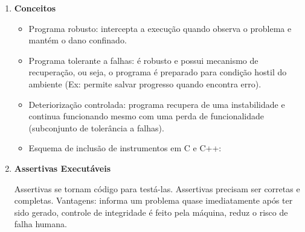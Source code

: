 \documentclass[
	12pt, %
]{fphw}
\begin{document}
\begin{doublespace}
\begin{enumerate}[label=\textbf{\arabic*})]
        \item \textbf{Conceitos}

              \begin{itemize}

                  \item Programa robusto: intercepta a execução quando observa o problema e mantém o dano confinado.
                  \item Programa tolerante a falhas: é robusto e possui mecanismo de recuperação, ou seja, o programa é preparado para condição hostil do ambiente (Ex: permite salvar progresso quando encontra erro).
                  \item Deteriorização controlada: programa recupera de uma instabilidade e continua funcionando mesmo com uma perda de funcionalidade (subconjunto de tolerância a falhas).
                  \item Esquema de inclusão de instrumentos em C e C++:



              \end{itemize}

        \item \textbf{Assertivas Executáveis}

              Assertivas se tornam código para testá-las. Assertivas precisam ser corretas e completas. Vantagens: informa um problema quase imediatamente após ter sido gerado, controle de integridade é feito pela máquina, reduz o risco de falha humana.

    \end{enumerate}


\end{doublespace}
\end{document}

